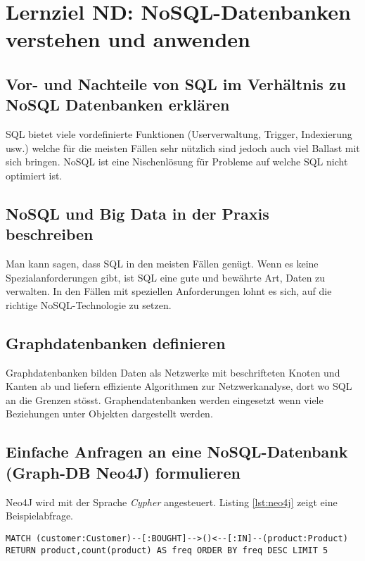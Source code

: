 \section{Lernziel ND: NoSQL-Datenbanken verstehen und anwenden}

\subsection{Vor- und Nachteile von SQL im Verhältnis zu NoSQL Datenbanken erklären}

SQL bietet viele vordefinierte Funktionen (Userverwaltung, Trigger, Indexierung usw.) welche für die meisten Fällen sehr nützlich sind jedoch auch viel Ballast mit sich bringen. NoSQL ist eine Nischenlösung für Probleme auf welche SQL nicht optimiert ist.

\subsection{NoSQL und Big Data in der Praxis beschreiben}

Man kann sagen, dass SQL in den meisten Fällen genügt. Wenn es keine Spezialanforderungen gibt, ist SQL eine gute und bewährte Art, Daten zu verwalten. In den Fällen mit speziellen Anforderungen lohnt es sich, auf die richtige NoSQL-Technologie zu setzen. 

\subsection{Graphdatenbanken definieren}

Graphdatenbanken bilden Daten als Netzwerke mit beschrifteten Knoten und Kanten ab und liefern effiziente Algorithmen zur Netzwerkanalyse, dort wo SQL an die Grenzen stösst. Graphendatenbanken werden eingesetzt wenn viele Beziehungen unter Objekten dargestellt werden.

\subsection{Einfache Anfragen an eine NoSQL-Datenbank (Graph-DB Neo4J) formulieren}

Neo4J wird mit der Sprache \emph{Cypher} angesteuert. Listing \ref{lst:neo4j} zeigt eine Beispielabfrage.

\begin{lstlisting}[caption={Beispielanfrage mit Cypher},label=lst:neo4j]
MATCH (customer:Customer)--[:BOUGHT]-->()<--[:IN]--(product:Product) RETURN product,count(product) AS freq ORDER BY freq DESC LIMIT 5
\end{lstlisting}